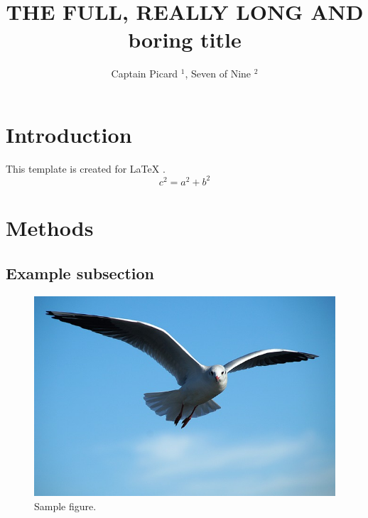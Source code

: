 \documentclass[en]{prtclass}
\author{Captain Picard $^1$, Seven of Nine $^2$}
\title{THE FULL, REALLY LONG AND boring title}
\begin{document}
\maketitle

\section{Introduction}
This template is created for LaTeX \cite{lamport1986latex}.
\blindtext[2]
\begin{equation}
c^{2} = a^{2} + b^{2} 
\end{equation}
\blindtext[2]


\section{Methods}
\blindtext[1]
\subsection{Example subsection}
\blindtext[1]
\begin{figure}
    \centering
    \includegraphics[width = 0.8\linewidth]{figures/sample_figure.jpg}
    \caption{Sample figure.}
    \label{fig:results}
\end{figure}

\blindtext[1]
\end{document}
